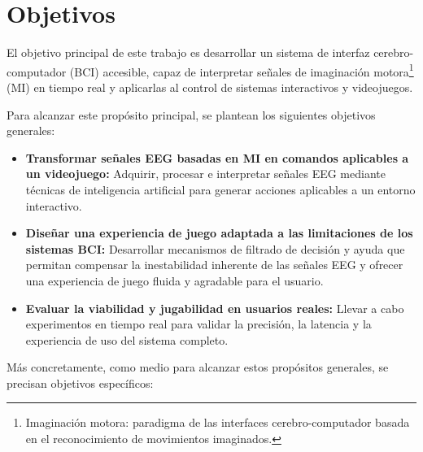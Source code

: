 \section{Objetivos}

El objetivo principal de este trabajo es desarrollar un sistema de interfaz
cerebro-computador (BCI) accesible, capaz de interpretar señales de imaginación
motora\footnote{Imaginación motora: paradigma de las interfaces cerebro-computador basada en el reconocimiento de movimientos imaginados.} (MI) en tiempo real y aplicarlas al control de sistemas interactivos y
videojuegos.

Para alcanzar este propósito principal, se plantean los siguientes objetivos
generales:

\begin{itemize}

    \item \textbf{Transformar señales EEG basadas en MI en comandos aplicables a un videojuego:}
          Adquirir, procesar e interpretar señales EEG mediante técnicas de inteligencia artificial para generar acciones aplicables a un entorno interactivo.

    \item \textbf{Diseñar una experiencia de juego adaptada a las limitaciones de los sistemas BCI:}
          Desarrollar mecanismos de filtrado de decisión y ayuda que permitan compensar la inestabilidad inherente de las señales EEG y ofrecer una experiencia de juego fluida y agradable para el usuario.

    \item \textbf{Evaluar la viabilidad y jugabilidad en usuarios reales:}
          Llevar a cabo experimentos en tiempo real para validar la precisión, la latencia y la experiencia de uso del sistema completo.

\end{itemize}

Más concretamente, como medio para alcanzar estos propósitos generales, se
precisan objetivos específicos:

